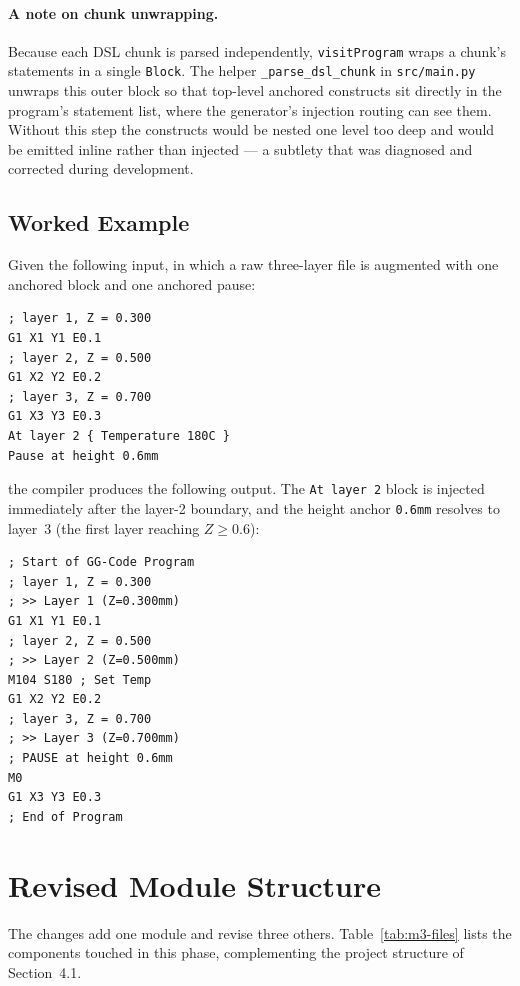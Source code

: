 \paragraph{A note on chunk unwrapping.}
Because each DSL chunk is parsed independently, \texttt{visitProgram} wraps a chunk's statements in a single \texttt{Block}. The helper \texttt{\_parse\_dsl\_chunk} in \texttt{src/main.py} unwraps this outer block so that top-level anchored constructs sit directly in the program's statement list, where the generator's injection routing can see them. Without this step the constructs would be nested one level too deep and would be emitted inline rather than injected --- a subtlety that was diagnosed and corrected during development.

\subsection*{Worked Example}

Given the following input, in which a raw three-layer file is augmented with one anchored block and one anchored pause:

\begin{verbatim}
; layer 1, Z = 0.300
G1 X1 Y1 E0.1
; layer 2, Z = 0.500
G1 X2 Y2 E0.2
; layer 3, Z = 0.700
G1 X3 Y3 E0.3
At layer 2 { Temperature 180C }
Pause at height 0.6mm
\end{verbatim}

the compiler produces the following output. The \texttt{At layer 2} block is injected immediately after the layer-2 boundary, and the height anchor \texttt{0.6mm} resolves to layer~3 (the first layer reaching $Z \geq 0.6$):

\begin{verbatim}
; Start of GG-Code Program
; layer 1, Z = 0.300
; >> Layer 1 (Z=0.300mm)
G1 X1 Y1 E0.1
; layer 2, Z = 0.500
; >> Layer 2 (Z=0.500mm)
M104 S180 ; Set Temp
G1 X2 Y2 E0.2
; layer 3, Z = 0.700
; >> Layer 3 (Z=0.700mm)
; PAUSE at height 0.6mm
M0
G1 X3 Y3 E0.3
; End of Program
\end{verbatim}

\section{Revised Module Structure}

The changes add one module and revise three others. Table~\ref{tab:m3-files} lists the components touched in this phase, complementing the project structure of Section~4.1.

